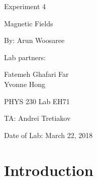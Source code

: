 \documentclass[letterpaper]{article}
\begin{document}
  \begin{titlepage}
    \begin{center}
        \vspace*{1cm}
        \Huge
        Experiment 4
        \vspace{1cm}

        Magnetic Fields
        \vspace{1cm}

        By: Arun Woosaree
        \vspace{1cm}

        Lab partners:
        \vspace{.25cm}
        \Large

        Fatemeh Ghafari Far\\
        \vspace{.25cm}
        Yvonne Hong
        \vspace{1cm}

        \Huge
        PHYS 230 Lab EH71
        \vspace{1cm}

        TA: Andrei Tretiakov
        \vspace{1cm}

        Date of Lab: March 22, 2018%
        \vfill
    \end{center}
\end{titlepage}

\section{Introduction}
\end{document}
